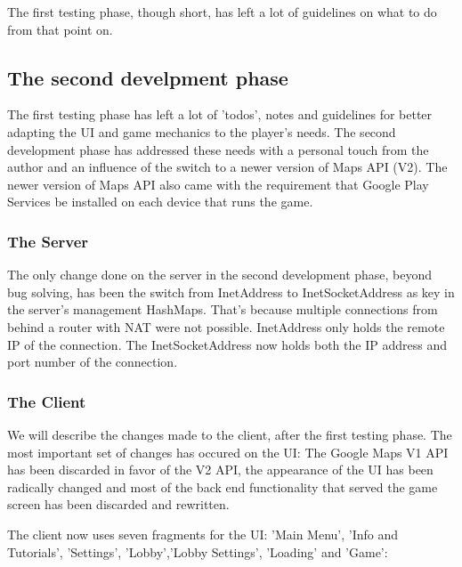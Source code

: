 The first testing phase, though short, has left a lot of guidelines on what to
do from that point on.\newline

\subsection{The second develpment phase}

The first testing phase has left a lot of 'todos', notes and guidelines for
better adapting the UI and game mechanics to the player's needs. The second
development phase has addressed these needs with a personal touch from the
author and an influence of the switch to a newer version of Maps API (V2). The
newer version of Maps API also came with the requirement that Google Play
Services be installed on each device that runs the game.

\subsubsection{The Server}

The only change done on the server in the second development phase, beyond bug
solving, has been the switch from InetAddress to InetSocketAddress as key in the
server's management HashMaps. That's because multiple connections from behind a
router with NAT were not possible. InetAddress only holds the remote IP of the
connection. The InetSocketAddress now holds both the IP address and port number
of the connection.

\subsubsection{The Client}

We will describe the changes made to the client, after the first testing phase.
The most important set of changes has occured on the UI: The Google Maps V1 API
has been discarded in favor of the V2 API, the appearance of the UI has been
radically changed and most of the back end functionality that served the game
screen has been discarded and rewritten.

The client now uses seven fragments for the UI: 'Main Menu', 'Info and
Tutorials', 'Settings', 'Lobby','Lobby Settings', 'Loading' and 'Game':

